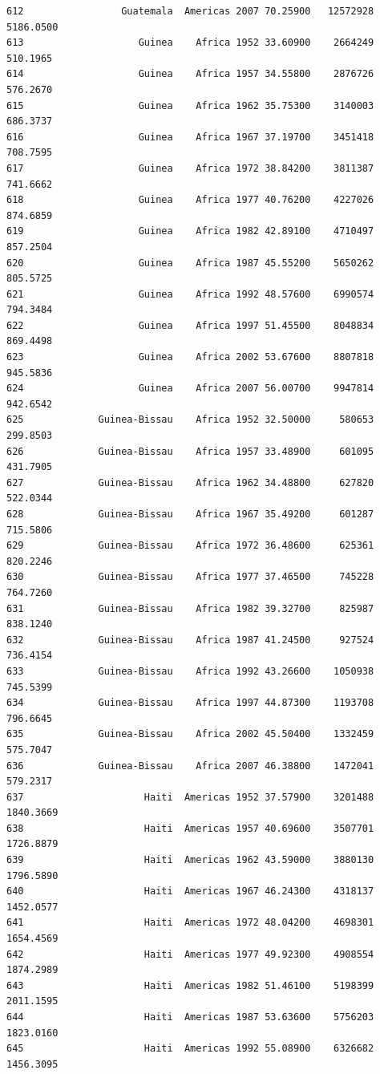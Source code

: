 \documentclass[
  letterpaper,
  DIV=11,
  numbers=noendperiod]{scrreprt}
\begin{document}
\begin{verbatim}
612                 Guatemala  Americas 2007 70.25900   12572928   5186.0500
613                    Guinea    Africa 1952 33.60900    2664249    510.1965
614                    Guinea    Africa 1957 34.55800    2876726    576.2670
615                    Guinea    Africa 1962 35.75300    3140003    686.3737
616                    Guinea    Africa 1967 37.19700    3451418    708.7595
617                    Guinea    Africa 1972 38.84200    3811387    741.6662
618                    Guinea    Africa 1977 40.76200    4227026    874.6859
619                    Guinea    Africa 1982 42.89100    4710497    857.2504
620                    Guinea    Africa 1987 45.55200    5650262    805.5725
621                    Guinea    Africa 1992 48.57600    6990574    794.3484
622                    Guinea    Africa 1997 51.45500    8048834    869.4498
623                    Guinea    Africa 2002 53.67600    8807818    945.5836
624                    Guinea    Africa 2007 56.00700    9947814    942.6542
625             Guinea-Bissau    Africa 1952 32.50000     580653    299.8503
626             Guinea-Bissau    Africa 1957 33.48900     601095    431.7905
627             Guinea-Bissau    Africa 1962 34.48800     627820    522.0344
628             Guinea-Bissau    Africa 1967 35.49200     601287    715.5806
629             Guinea-Bissau    Africa 1972 36.48600     625361    820.2246
630             Guinea-Bissau    Africa 1977 37.46500     745228    764.7260
631             Guinea-Bissau    Africa 1982 39.32700     825987    838.1240
632             Guinea-Bissau    Africa 1987 41.24500     927524    736.4154
633             Guinea-Bissau    Africa 1992 43.26600    1050938    745.5399
634             Guinea-Bissau    Africa 1997 44.87300    1193708    796.6645
635             Guinea-Bissau    Africa 2002 45.50400    1332459    575.7047
636             Guinea-Bissau    Africa 2007 46.38800    1472041    579.2317
637                     Haiti  Americas 1952 37.57900    3201488   1840.3669
638                     Haiti  Americas 1957 40.69600    3507701   1726.8879
639                     Haiti  Americas 1962 43.59000    3880130   1796.5890
640                     Haiti  Americas 1967 46.24300    4318137   1452.0577
641                     Haiti  Americas 1972 48.04200    4698301   1654.4569
642                     Haiti  Americas 1977 49.92300    4908554   1874.2989
643                     Haiti  Americas 1982 51.46100    5198399   2011.1595
644                     Haiti  Americas 1987 53.63600    5756203   1823.0160
645                     Haiti  Americas 1992 55.08900    6326682   1456.3095

\end{verbatim}
\end{document}
